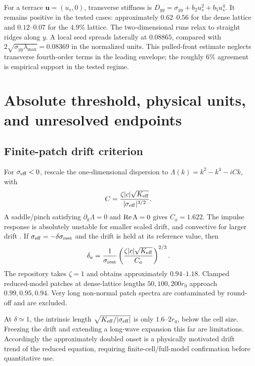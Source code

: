 For a terrace $\bm u=(u_s,0)$, transverse stiffness is $D_{yy}=\sigma_{yy}+b_2u_s^2+b_5u_s^4$. It remains positive in the tested cases: approximately $0.62$--$0.56$ for the dense lattice and $0.12$--$0.07$ for the $4.9\%$ lattice. The two-dimensional runs relax to straight ridges along $y$. A local seed spreads laterally at $0.08865$, compared with $2\sqrt{\sigma_{yy}\lambda_{\max}}=0.08369$ in the normalized units. This pulled-front estimate neglects transverse fourth-order terms in the leading envelope; the roughly $6\%$ agreement is empirical support in the tested regime.

\section{Absolute threshold, physical units, and unresolved endpoints}
\subsection{Finite-patch drift criterion}
For $\sigma_{\rm eff}<0$, rescale the one-dimensional dispersion to $\Lambda(k)=k^2-k^4-iCk$, with
\begin{equation}
C=\frac{\zeta|c|\sqrt{K_{\rm eff}}}{|\sigma_{\rm eff}|^{3/2}}.
\end{equation}
A saddle/pinch satisfying $\partial_k\Lambda=0$ and $\operatorname{Re}\Lambda=0$ gives $C_a=1.622$. The impulse response is absolutely unstable for smaller scaled drift, and convective for larger drift \cite{huerre}. If $\sigma_{\rm eff}=-\delta\sigma_{\rm rest}$ and the drift is held at its reference value, then
\begin{equation}
\delta_a=\frac{1}{\sigma_{\rm rest}}\left(\frac{\zeta|c|\sqrt{K_{\rm eff}}}{C_a}\right)^{2/3}.
\end{equation}
The repository takes $\zeta=1$ and obtains approximately $0.94$--$1.18$. Clamped reduced-model patches at dense-lattice lengths $50,100,200r_0$ approach $0.99,0.95,0.94$. Very long non-normal patch spectra are contaminated by round-off and are excluded.

At $\delta\simeq1$, the intrinsic length $\sqrt{K_{\rm eff}/|\sigma_{\rm eff}|}$ is only $1.6$--$2r_0$, below the cell size. Freezing the drift and extending a long-wave expansion this far are limitations. Accordingly the approximately doubled onset is a physically motivated drift trend of the reduced equation, requiring finite-cell/full-model confirmation before quantitative use.

